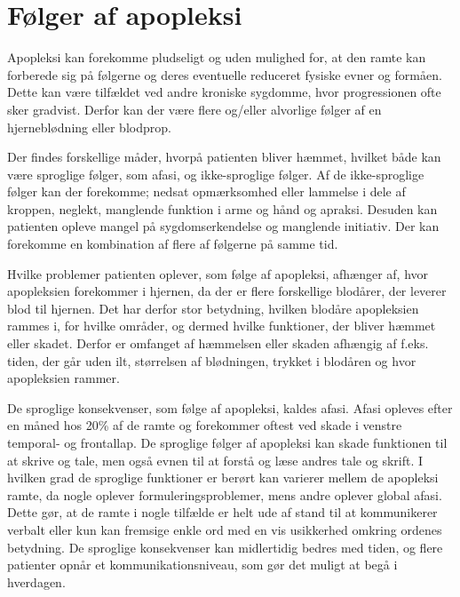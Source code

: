 \section{Følger af apopleksi }
Apopleksi kan forekomme pludseligt og uden mulighed for, at den ramte kan forberede sig på følgerne og deres eventuelle reduceret fysiske evner og formåen. Dette kan være tilfældet ved andre kroniske sygdomme, hvor progressionen ofte sker gradvist. Derfor kan der være flere og/eller alvorlige følger af en hjerneblødning eller blodprop. \citep{Muus2008}

Der findes forskellige måder, hvorpå patienten bliver hæmmet, hvilket både kan være sproglige følger, som afasi, og ikke-sproglige følger. Af de ikke-sproglige følger kan der forekomme; nedsat opmærksomhed eller lammelse i dele af kroppen, neglekt, manglende funktion i arme og hånd og apraksi. Desuden kan patienten opleve mangel på sygdomserkendelse og manglende initiativ. Der kan forekomme en kombination af flere af følgerne på samme tid. \citep{Christensen&Zielke2008}\citep{Sundhed.dk}

Hvilke problemer patienten oplever, som følge af apopleksi, afhænger af, hvor apopleksien forekommer i hjernen, da der er flere forskellige blodårer, der leverer blod til hjernen. Det har derfor stor betydning, hvilken blodåre apopleksien rammes i, for hvilke områder, og dermed hvilke funktioner, der bliver hæmmet eller skadet. Derfor er omfanget af hæmmelsen eller skaden afhængig af f.eks. tiden, der går uden ilt, størrelsen af blødningen, trykket i blodåren og hvor apopleksien rammer.\citep{Michael-Titus2010}

De sproglige konsekvenser, som følge af apopleksi, kaldes afasi.  Afasi opleves efter en måned hos 20\% af de ramte og forekommer oftest ved skade i venstre temporal- og frontallap. De sproglige følger af apopleksi kan skade funktionen til at skrive og tale, men også evnen til at forstå og læse andres tale og skrift. I hvilken grad de sproglige funktioner er berørt kan varierer mellem de apopleksi ramte, da nogle oplever formuleringsproblemer, mens andre oplever global afasi. Dette gør, at de ramte i nogle tilfælde er helt ude af stand til at kommunikerer verbalt eller kun kan fremsige enkle ord med en vis usikkerhed omkring ordenes betydning. De sproglige konsekvenser kan midlertidig bedres med tiden, og flere patienter opnår et kommunikationsniveau, som gør det muligt at begå i hverdagen.\citep{Muus2008}

